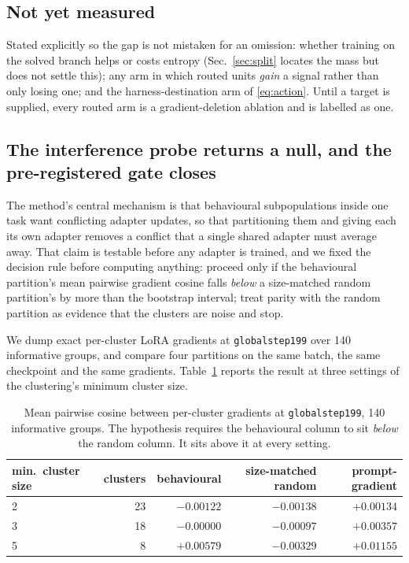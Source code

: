 \subsection{Not yet measured}

Stated explicitly so the gap is not mistaken for an omission: whether training on the
solved branch helps or costs entropy (Sec.~\ref{sec:split} locates the mass but does not
settle this); any arm in which routed units \emph{gain} a signal
rather than only losing one; and the harness-destination arm of \eqref{eq:action}. Until a
target is supplied, every routed arm is a gradient-deletion ablation and is labelled as one.

\subsection{The interference probe returns a null, and the pre-registered gate closes}
\label{sec:gate0}

The method's central mechanism is that behavioural subpopulations inside one task want
conflicting adapter updates, so that partitioning them and giving each its own adapter removes
a conflict that a single shared adapter must average away. That claim is testable before any
adapter is trained, and we fixed the decision rule before computing anything: proceed only if
the behavioural partition's mean pairwise gradient cosine falls \emph{below} a size-matched
random partition's by more than the bootstrap interval; treat parity with the random partition
as evidence that the clusters are noise and stop.

We dump exact per-cluster LoRA gradients at \texttt{globalstep199} over 140 informative
groups, and compare four partitions on the same batch, the same checkpoint and the same
gradients. Table~\ref{tab:gate0} reports the result at three settings of the clustering's
minimum cluster size.

\begin{table}[t]
\centering
\begin{tabular}{lrrrr}
\toprule
min.\ cluster size & clusters & behavioural & size-matched random & prompt-gradient \\
\midrule
2 & 23 & $-0.00122$ & $-0.00138$ & $+0.00134$ \\
3 & 18 & $-0.00000$ & $-0.00097$ & $+0.00357$ \\
5 & \phantom{0}8 & $+0.00579$ & $-0.00329$ & $+0.01155$ \\
\bottomrule
\end{tabular}
\caption{Mean pairwise cosine between per-cluster gradients at \texttt{globalstep199}, 140
informative groups. The hypothesis requires the behavioural column to sit \emph{below} the
random column. It sits above it at every setting.}
\label{tab:gate0}
\end{table}

